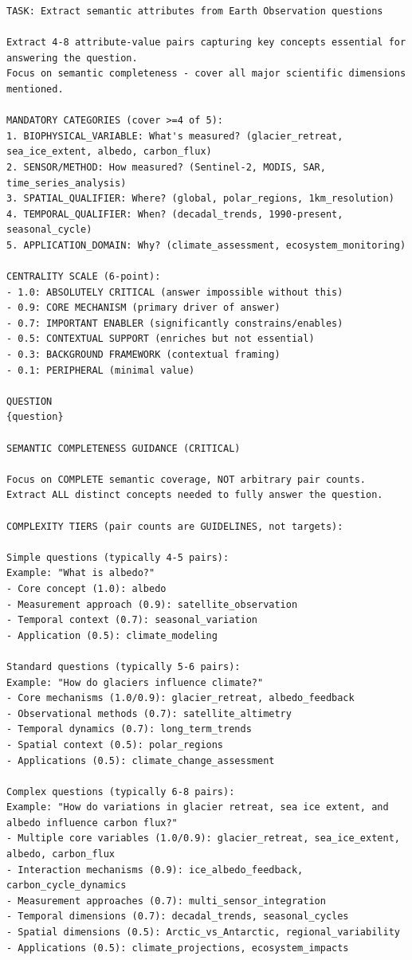\begin{lstlisting}[style=promptstyle,
caption={Ontology Agent extraction prompt (full).},
label={lst:ontology-prompt}]
TASK: Extract semantic attributes from Earth Observation questions

Extract 4-8 attribute-value pairs capturing key concepts essential for answering the question.
Focus on semantic completeness - cover all major scientific dimensions mentioned.

MANDATORY CATEGORIES (cover >=4 of 5):
1. BIOPHYSICAL_VARIABLE: What's measured? (glacier_retreat, sea_ice_extent, albedo, carbon_flux)
2. SENSOR/METHOD: How measured? (Sentinel-2, MODIS, SAR, time_series_analysis)
3. SPATIAL_QUALIFIER: Where? (global, polar_regions, 1km_resolution)
4. TEMPORAL_QUALIFIER: When? (decadal_trends, 1990-present, seasonal_cycle)
5. APPLICATION_DOMAIN: Why? (climate_assessment, ecosystem_monitoring)

CENTRALITY SCALE (6-point):
- 1.0: ABSOLUTELY CRITICAL (answer impossible without this)
- 0.9: CORE MECHANISM (primary driver of answer)
- 0.7: IMPORTANT ENABLER (significantly constrains/enables)
- 0.5: CONTEXTUAL SUPPORT (enriches but not essential)
- 0.3: BACKGROUND FRAMEWORK (contextual framing)
- 0.1: PERIPHERAL (minimal value)

QUESTION
{question}

SEMANTIC COMPLETENESS GUIDANCE (CRITICAL)

Focus on COMPLETE semantic coverage, NOT arbitrary pair counts.
Extract ALL distinct concepts needed to fully answer the question.

COMPLEXITY TIERS (pair counts are GUIDELINES, not targets):

Simple questions (typically 4-5 pairs):
Example: "What is albedo?"
- Core concept (1.0): albedo
- Measurement approach (0.9): satellite_observation
- Temporal context (0.7): seasonal_variation
- Application (0.5): climate_modeling

Standard questions (typically 5-6 pairs):
Example: "How do glaciers influence climate?"
- Core mechanisms (1.0/0.9): glacier_retreat, albedo_feedback
- Observational methods (0.7): satellite_altimetry
- Temporal dynamics (0.7): long_term_trends
- Spatial context (0.5): polar_regions
- Applications (0.5): climate_change_assessment

Complex questions (typically 6-8 pairs):
Example: "How do variations in glacier retreat, sea ice extent, and albedo influence carbon flux?"
- Multiple core variables (1.0/0.9): glacier_retreat, sea_ice_extent, albedo, carbon_flux
- Interaction mechanisms (0.9): ice_albedo_feedback, carbon_cycle_dynamics
- Measurement approaches (0.7): multi_sensor_integration
- Temporal dimensions (0.7): decadal_trends, seasonal_cycles
- Spatial dimensions (0.5): Arctic_vs_Antarctic, regional_variability
- Applications (0.5): climate_projections, ecosystem_impacts


\end{lstlisting}
